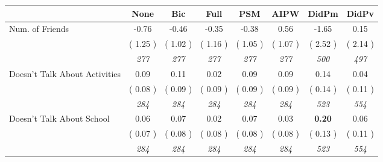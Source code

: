 \begin{tabular}{l c c c c c c c}
\toprule
 & None & Bic & Full & PSM & AIPW & DidPm & DidPv \\
\midrule
Num. of Friends &     -0.76 &     -0.46 &     -0.35 &     -0.38 &      0.56 &     -1.65 &      0.15 \\
& (     1.25 ) & (     1.02 ) & (     1.16 ) & (     1.05 ) & (     1.07 ) & (     2.52 ) & (     2.14 ) \\
& \textit{ 277 } & \textit{ 277 } & \textit{ 277 } & \textit{ 277 } & \textit{ 277 } & \textit{ 500 } & \textit{ 497 } \\
Doesn't Talk About Activities &      0.09 &      0.11 &      0.02 &      0.09 &      0.09 &      0.14 &      0.04 \\
& (     0.08 ) & (     0.09 ) & (     0.09 ) & (     0.09 ) & (     0.09 ) & (     0.14 ) & (     0.11 ) \\
& \textit{ 284 } & \textit{ 284 } & \textit{ 284 } & \textit{ 284 } & \textit{ 284 } & \textit{ 523 } & \textit{ 554 } \\
Doesn't Talk About School &      0.06 &      0.07 &      0.02 &      0.07 &      0.03 & \textbf{      0.20 } &      0.06 \\
& (     0.07 ) & (     0.08 ) & (     0.08 ) & (     0.08 ) & (     0.08 ) & (     0.13 ) & (     0.11 ) \\
& \textit{ 284 } & \textit{ 284 } & \textit{ 284 } & \textit{ 284 } & \textit{ 284 } & \textit{ 523 } & \textit{ 554 } \\
\bottomrule
\end{tabular}
